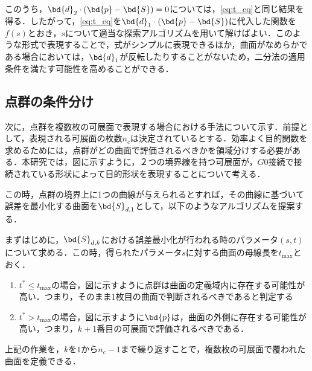 		
		このうち，$ \bd{d}_2 \cdot (\bd{p} - \bd{S}) = 0 $については，\ref{eq:t_eq}と同じ結果を得る．したがって，\ref{eq:t_eq}を$ \bd{d}_1 \cdot (\bd{p} - \bd{S}) $に代入した関数を$ f(s) $とおき，$ s $について適当な探索アルゴリズムを用いて解けばよい．このような形式で表現することで，式がシンプルに表現できるほか，曲面がなめらかである場合においては，$ \bd{d}_1 $が反転したりすることがないため，二分法の適用条件を満たす可能性を高めることができる．
	\subsection{点群の条件分け}
		次に，点群を複数枚の可展面で表現する場合における手法について示す．前提として，表現される可展面の枚数$ n_c $は決定されているとする．効率よく目的関数を求めるためには，点群がどの曲面で評価されるべきかを領域分けする必要がある．本研究では，図に示すように，２つの境界線を持つ可展面が，$ G0 $接続で接続されている形状によって目的形状を表現することについて考える．
		
		
		この時，点群の境界上に1つの曲線が与えられるとすれば，その曲線に基づいて誤差を最小化する曲面を$ \bd{S}_{d,1} $として，以下のようなアルゴリズムを提案する．
		
		まずはじめに，$ \bd{S}_{d,k} $における誤差最小化が行われる時のパラメータ$ (s,t) $について求める．この時，得られたパラメータ$ s $に対する曲面の母線長を$ t_{\max} $とおく．
		\begin{enumerate}
			\item $ t^* \leq t_{\max} $の場合，図に示すように点群は曲面の定義域内に存在する可能性が高い．つまり，そのまま1枚目の曲面で判断されるべきであると判定する
			\item $ t^* > t_{\max} $の場合，図に示すように$\bd{p} $は，曲面の外側に存在する可能性が高い，つまり，$ k+1 $番目の可展面で評価されるべきである．
		\end{enumerate}
		上記の作業を，$ k $を$ 1 $から$ n_c-1 $まで繰り返すことで，複数枚の可展面で覆われた曲面を定義できる．
		